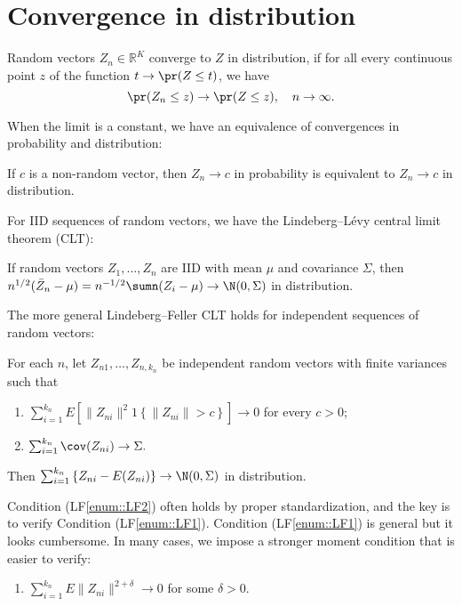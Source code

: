 \section{Convergence in distribution}


\begin{definition}
Random vectors $Z_{n}\in\mathbb{R}^{K}$ converge to $Z$ in distribution,
if for all every continuous point $z$ of the function $t\rightarrow\pr(Z\leq t)$, we have 
\[
\pr(Z_{n}\leq z)\rightarrow\pr(Z\leq z),\quad n\rightarrow\infty.
\]
\end{definition}

When the limit is a constant, we have an equivalence of convergences
in probability and distribution:

\begin{proposition}
If $c$ is a non-random vector, then $Z_{n}\rightarrow c$ in probability
is equivalent to $Z_{n}\rightarrow c$ in distribution.
\end{proposition}


For IID sequences of random vectors, we have the Lindeberg--L\'{e}vy central limit theorem
(CLT):
\begin{proposition}
If random vectors $Z_{1},\ldots,Z_{n}$ are \textup{IID} with mean $\mu$
and covariance $\Sigma$, then $n^{1/2}(\bar{Z}_{n}-\mu)=n^{-1/2}\sumn(Z_{i}-\mu)\rightarrow\N(0,\Sigma)$
in distribution. 
\end{proposition}


The more general Lindeberg--Feller CLT holds for independent sequences
of random vectors:
\begin{proposition}\label{prop::lf-clt}
For each $n$, let $Z_{n1},\ldots,Z_{n,k_{n}}$ be independent random
vectors with finite variances such that
\begin{enumerate}
[(LF1)]
\item\label{enum::LF1} $\sum_{i=1}^{k_{n}}E\left[\|Z_{ni}\|^{2}1\left\{ \|Z_{ni}\|>c\right\} \right]\rightarrow0$
for every $c>0$;
\item\label{enum::LF2} $\sum_{i=1}^{k_{n}}\cov(Z_{ni})\rightarrow\Sigma.$ 
\end{enumerate}
Then $\sum_{i=1}^{k_{n}}\left\{ Z_{ni}-E(Z_{ni})\right\} \rightarrow\N(0,\Sigma)$
in distribution.
\end{proposition}


Condition (LF\ref{enum::LF2}) often holds by proper standardization, and the key is to verify Condition (LF\ref{enum::LF1}). 
Condition (LF\ref{enum::LF1}) is general but it looks cumbersome. In many cases, we impose a stronger moment condition that is easier to verify:
\begin{enumerate}
[(LF1')]
\item\label{enum::LF'1} $\sum_{i=1}^{k_{n}}E \|Z_{ni}\|^{2+\delta} \rightarrow 0$ for some $\delta >0$. 
\end{enumerate}

